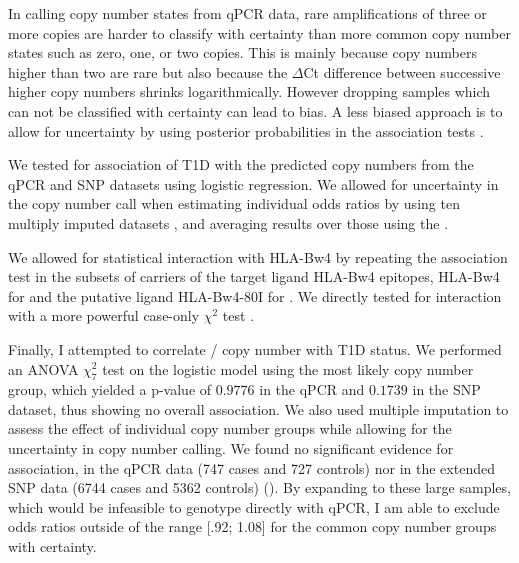 In calling copy number states from qPCR data, rare amplifications of three or more copies are harder to classify with certainty than more common copy number states such as zero, one, or two copies.
This is mainly because copy numbers higher than two are rare but also because the $\Delta$Ct difference between successive higher copy numbers shrinks logarithmically.
However dropping samples which can not be classified with certainty can lead to bias.
A less biased approach is to allow for uncertainty by using posterior probabilities in the association tests \citep{Plagnol:2007dw}.  


We tested for association of T1D with the predicted copy numbers from the qPCR and SNP datasets using logistic regression.
We allowed for uncertainty in the copy number call when estimating individual odds ratios by using ten multiply imputed datasets \citep{Cordell:2006da},
and averaging results over those using the .

We allowed for statistical interaction with HLA-Bw4 by repeating the association test in the subsets of carriers of the target ligand HLA-Bw4 epitopes, HLA-Bw4 for  and the putative ligand HLA-Bw4-80I for .
We directly tested for interaction with a more powerful case-only $\chi^2$ test \citep{Yang:1999wk,Cordell:2009jb}.


Finally, I attempted to correlate / copy number with T1D status.
We performed an \Gls{ANOVA} $\chi^{2}_{7}$ test on the logistic model using the most likely copy number group,
which yielded a p-value of $0.9776$ in the qPCR and $0.1739$ in the SNP dataset, thus showing no overall association.
We also used multiple imputation to assess the effect of individual copy number groups while allowing for the uncertainty in copy number calling.
We found no significant evidence for association, in the qPCR
data (747 cases and 727 controls) nor in the extended SNP data (6744
cases and 5362 controls) ().
By expanding to these large samples, which would be infeasible to genotype directly with
qPCR, I am able to exclude odds ratios outside of the range
[.92; 1.08] for the common copy number groups with  certainty.

